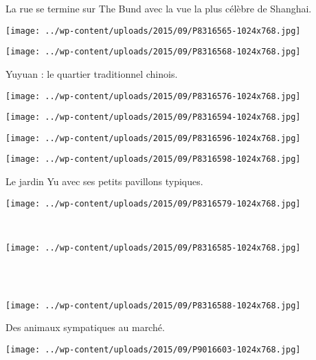  La rue se termine sur The Bund avec la vue la plus célèbre de Shanghai.
\begin{center} \texttt{[image: ../wp-content/uploads/2015/09/P8316565-1024x768.jpg]} \end{center}
\begin{center} \texttt{[image: ../wp-content/uploads/2015/09/P8316568-1024x768.jpg]} \end{center}

 Yuyuan : le quartier traditionnel chinois.
\begin{center} \texttt{[image: ../wp-content/uploads/2015/09/P8316576-1024x768.jpg]} \end{center}
\begin{center} \texttt{[image: ../wp-content/uploads/2015/09/P8316594-1024x768.jpg]} \end{center}
\begin{center} \texttt{[image: ../wp-content/uploads/2015/09/P8316596-1024x768.jpg]} \end{center}
\begin{center} \texttt{[image: ../wp-content/uploads/2015/09/P8316598-1024x768.jpg]} \end{center}

 Le jardin Yu avec ses petits pavillons typiques.
\begin{center} \texttt{[image: ../wp-content/uploads/2015/09/P8316579-1024x768.jpg]} \end{center}
\vspace{-\topsep}
\pagebreak

~
\vspace{0.5mm}
\begin{center} \texttt{[image: ../wp-content/uploads/2015/09/P8316585-1024x768.jpg]} \end{center}
~\\~\\
\begin{center} \texttt{[image: ../wp-content/uploads/2015/09/P8316588-1024x768.jpg]} \end{center}
\vspace{-\topsep}
\pagebreak

 Des animaux sympatiques au marché.
\begin{center} \texttt{[image: ../wp-content/uploads/2015/09/P9016603-1024x768.jpg]} \end{center}


